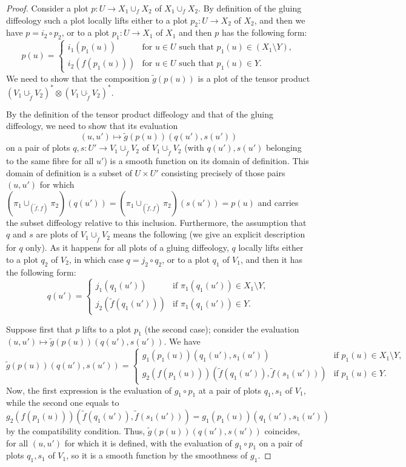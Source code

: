 \documentclass{article}
\begin{document}
\begin{proof}
Consider a plot $p:U\to X_1\cup_f X_2$ of $X_1\cup_f X_2$. By definition of the gluing diffeology such a plot locally lifts either to a plot $p_2:U\to X_2$ of $X_2$, and then we have $p=i_2\circ p_2$, or to a 
plot $p_1:U\to X_1$ of $X_1$ and then $p$ has the following form:
$$p(u)=\left\{\begin{array}{ll}
i_1(p_1(u)) & \mbox{for }u\in U\mbox{ such that }p_1(u)\in(X_1\setminus Y),\\
i_2(f(p_1(u))) & \mbox{for }u\in U\mbox{ such that }p_1(u)\in Y.\end{array}\right.$$ We need to show that the composition $\tilde{g}(p(u))$ is a plot of the tensor product
$(V_1\cup_{\tilde{f}}V_2)^*\otimes(V_1\cup_{\tilde{f}}V_2)^*$.

By the definition of the tensor product diffeology and that of the gluing diffeology, we need to show that its evaluation
$$(u,u')\mapsto\tilde{g}(p(u))(q(u'),s(u'))$$ on a pair of plots $q,s:U'\to V_1\cup_{\tilde{f}}V_2$ of $V_1\cup_{\tilde{f}}V_2$ (with $q(u'),s(u')$ belonging to the same fibre for all $u'$) is a smooth function on its 
domain of definition. This domain of definition is a subset of $U\times U'$ consisting precisely of those pairs $(u,u')$ for which $(\pi_1\cup_{(\tilde{f},f)}\pi_2)(q(u'))=(\pi_1\cup_{(\tilde{f},f)}\pi_2)(s(u'))=p(u)$
and carries the subset diffeology relative to this inclusion. Furthermore, the assumption that $q$ and $s$ are plots of $V_1\cup_{\tilde{f}}V_2$ means the following (we give an explicit description for $q$ only). 
As it happens for all plots of a gluing diffeology, $q$ locally lifts either to a plot $q_2$ of $V_2$, in which case $q=j_2\circ q_2$, or to a plot $q_1$ of $V_1$, and then it has the following form:
$$q(u')=\left\{\begin{array}{ll} j_1(q_1(u')) & \mbox{if }\pi_1(q_1(u'))\in X_1\setminus Y,\\
j_2(\tilde{f}(q_1(u'))) & \mbox{if }\pi_1(q_1(u'))\in Y. \end{array}\right.$$

Suppose first that $p$ lifts to a plot $p_1$ (the second case); consider the evaluation $(u,u')\mapsto\tilde{g}(p(u))(q(u'),s(u'))$. We have
$$\tilde{g}(p(u))(q(u'),s(u'))=\left\{\begin{array}{ll} g_1(p_1(u))(q_1(u'),s_1(u')) & \mbox{if }p_1(u)\in X_1\setminus Y,\\
g_2(f(p_1(u)))(\tilde{f}(q_1(u')),\tilde{f}(s_1(u'))) & \mbox{if }p_1(u)\in Y.\end{array}\right.$$ Now, the first expression is the evaluation of $g_1\circ p_1$ at a pair of plots $q_1,s_1$ of $V_1$, while the second 
one equals to
$$g_2(f(p_1(u)))(\tilde{f}(q_1(u')),\tilde{f}(s_1(u')))=g_1(p_1(u))(q_1(u'),s_1(u'))$$ by the compatibility condition. Thus, $\tilde{g}(p(u))(q(u'),s(u'))$ coincides, for all $(u,u')$ for which it is defined, with the
evaluation of $g_1\circ p_1$ on a pair of plots $q_1,s_1$ of $V_1$, so it is a smooth function by the smoothness of $g_1$.


\end{proof}
\end{document}
